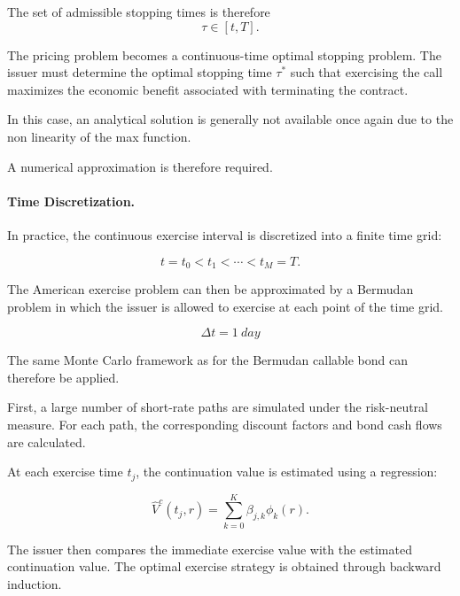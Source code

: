 \documentclass{article}
\begin{document}
The set of admissible stopping times is therefore
\begin{equation}
\tau \in[t,T].
\end{equation}

The pricing problem becomes a continuous-time optimal stopping
problem. The issuer must determine the optimal stopping time
$\tau^*$ such that exercising the call maximizes the economic
benefit associated with terminating the contract.

In this case, an analytical solution is generally not available once again due to the non linearity of the max function.

A numerical approximation is therefore required.

\paragraph{Time Discretization.}

In practice, the continuous exercise interval is discretized into a
finite time grid:

\begin{equation}
    t=t_0
    <
    t_1
    <
    \cdots
    <
    t_M=T.
\end{equation}

The American exercise problem can then be approximated by a
Bermudan problem in which the issuer is allowed to exercise at each
point of the time grid.

\begin{equation}
    \Delta t
    =
    1\ day
\end{equation}


The same Monte Carlo framework as for the Bermudan callable bond
can therefore be applied.

First, a large number of short-rate paths are simulated under the
risk-neutral measure. For each path, the corresponding discount
factors and bond cash flows are calculated.

At each exercise time $t_j$, the continuation value is estimated
using a regression:

\begin{equation}
    \widehat{V}^c(t_j,r)
    =
    \sum_{k=0}^{K}
    \beta_{j,k}\phi_k(r).
\end{equation}

The issuer then compares the immediate exercise value with the
estimated continuation value. The optimal exercise strategy is
obtained through backward induction.
\end{document}
